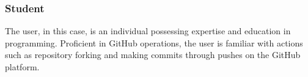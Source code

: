 \subsubsection{Student}
The user, in this case, is an individual possessing expertise and education in programming. Proficient in GitHub operations, the user is familiar with actions such as repository forking and making commits through pushes on the GitHub platform.






